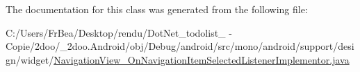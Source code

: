 The documentation for this class was generated from the following file:\begin{CompactItemize}
\item 
C:/Users/FrBea/Desktop/rendu/DotNet\_\-todolist\_ - Copie/2doo/\_\-2doo.Android/obj/Debug/android/src/mono/android/support/design/widget/\hyperlink{_navigation_view___on_navigation_item_selected_listener_implementor_8java}{NavigationView\_\-OnNavigationItemSelectedListenerImplementor.java}\end{CompactItemize}
